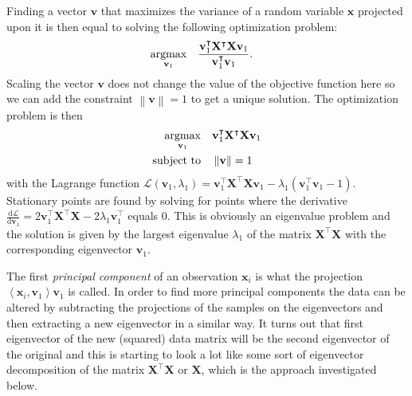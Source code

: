 \documentclass[a4paper, 12pt]{scrartcl}
\newcommand{\bfx}{\mathbf{x}}
\newcommand{\inner}[2]{\left\langle #1, #2 \right\rangle}
\begin{document}
Finding a vector $\mathbf{v}$ that maximizes the variance of a random variable $\bfx$ projected upon it is then equal to solving the following optimization problem:
\begin{equation*}
\begin{aligned}
	\operatornamewithlimits{argmax}_{\mathbf{v}_1} & & &\frac{\mathbf{v}_1^\intercal\mathbf{X}^\intercal\mathbf{X}\mathbf{v}_1}{\mathbf{v}_1^\intercal\mathbf{v}_1}.
\end{aligned}
\end{equation*}
Scaling the vector $\mathbf{v}$ does not change the value of the objective function here so we can add the constraint $\left\|\mathbf{v}\right\|=1$ to get a unique solution. The optimization problem is then
\begin{equation*}
\begin{aligned}
\operatornamewithlimits{argmax}_{\mathbf{v}_1} & & &\mathbf{v}_1^\intercal\mathbf{X}^\intercal\mathbf{X}\mathbf{v}_1\\
\text{subject to} & & &\left\|\mathbf{v}\right\|=1
\end{aligned}
\end{equation*}
with the Lagrange function
	$\mathcal{L}\left(\mathbf{v}_1, \lambda_1\right)=\mathbf{v}_1^\intercal\mathbf{X}^\intercal\mathbf{X}\mathbf{v}_1-\lambda_1\left(\mathbf{v}_1^\intercal\mathbf{v}_1-1\right)$.
Stationary points are found by solving for points where the derivative $\frac{\mathrm{d}\mathcal{L}}{\mathrm{d}\mathbf{v}_1}=2\mathbf{v}_1^\intercal\mathbf{X}^\intercal\mathbf{X}-2\lambda_1\mathbf{v}_1^\intercal$ equals 0.
This is obviously an eigenvalue problem and the solution is given by the largest eigenvalue $\lambda_1$ of the matrix $\mathbf{X}^\intercal\mathbf{X}$  with the corresponding eigenvector $\mathbf{v}_1$.

The first \emph{principal component} of an observation $\bfx_i$ is what the projection $\inner{\bfx_i}{\mathbf{v}_1}\mathbf{v}_1$ is called.
In order to find more principal components the data can be altered by subtracting the projections of the samples on the eigenvectors and then extracting a new eigenvector in a similar way.
It turns out that first eigenvector of the new (squared) data matrix will be the second eigenvector of the original and this is starting to look a lot like some sort of eigenvector decomposition of the matrix $\mathbf{X}^\intercal\mathbf{X}$ or $\mathbf{X}$, which is the approach investigated below. 
\end{document}

